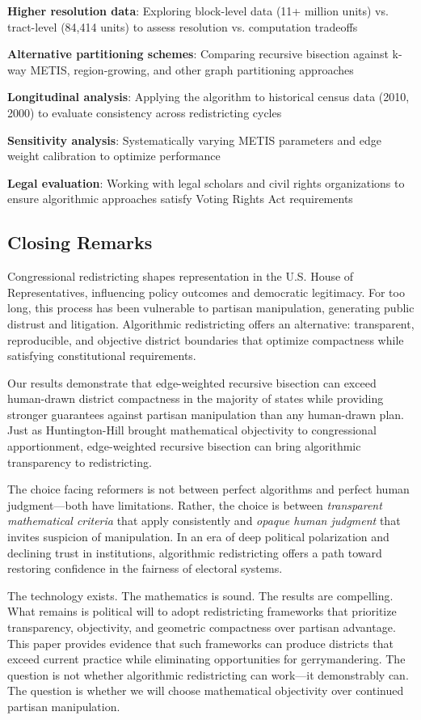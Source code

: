 \textbf{Higher resolution data}: Exploring block-level data (11+ million units) vs. tract-level (84,414 units) to assess resolution vs. computation tradeoffs

\textbf{Alternative partitioning schemes}: Comparing recursive bisection against k-way METIS, region-growing, and other graph partitioning approaches

\textbf{Longitudinal analysis}: Applying the algorithm to historical census data (2010, 2000) to evaluate consistency across redistricting cycles

\textbf{Sensitivity analysis}: Systematically varying METIS parameters and edge weight calibration to optimize performance

\textbf{Legal evaluation}: Working with legal scholars and civil rights organizations to ensure algorithmic approaches satisfy Voting Rights Act requirements

\subsection{Closing Remarks}

Congressional redistricting shapes representation in the U.S. House of Representatives, influencing policy outcomes and democratic legitimacy. For too long, this process has been vulnerable to partisan manipulation, generating public distrust and litigation. Algorithmic redistricting offers an alternative: transparent, reproducible, and objective district boundaries that optimize compactness while satisfying constitutional requirements.

Our results demonstrate that edge-weighted recursive bisection can exceed human-drawn district compactness in the majority of states while providing stronger guarantees against partisan manipulation than any human-drawn plan. Just as Huntington-Hill brought mathematical objectivity to congressional apportionment, edge-weighted recursive bisection can bring algorithmic transparency to redistricting.

The choice facing reformers is not between perfect algorithms and perfect human judgment—both have limitations. Rather, the choice is between \textit{transparent mathematical criteria} that apply consistently and \textit{opaque human judgment} that invites suspicion of manipulation. In an era of deep political polarization and declining trust in institutions, algorithmic redistricting offers a path toward restoring confidence in the fairness of electoral systems.

The technology exists. The mathematics is sound. The results are compelling. What remains is political will to adopt redistricting frameworks that prioritize transparency, objectivity, and geometric compactness over partisan advantage. This paper provides evidence that such frameworks can produce districts that exceed current practice while eliminating opportunities for gerrymandering. The question is not whether algorithmic redistricting can work—it demonstrably can. The question is whether we will choose mathematical objectivity over continued partisan manipulation.

